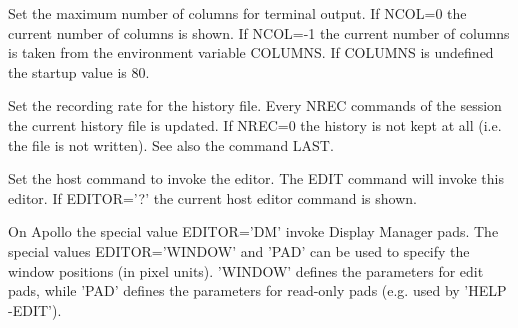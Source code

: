 \ENDCMD


\BEGARG
{}
\ENDARG

   \par
Set the maximum number of columns for terminal output.  If NCOL=0 the 
   current number of columns is shown.  If NCOL=-1 the current number of 
   columns is taken from the environment variable COLUMNS.  If COLUMNS is 
   undefined the startup value is 80.  

\ENDCMD


\BEGARG
{}
\ENDARG

   \par
Set the recording rate for the history file.  Every NREC commands of the 
   session the current history file is updated.  If NREC=0 the history is not 
   kept at all (i.e. the file is not written).  See also the command LAST.  

\ENDCMD


\BEGARG
{}
\ENDARG

   \par
Set the host command to invoke the editor.  The EDIT command will invoke 
   this editor.  If EDITOR='?' the current host editor command is shown.  

   \par
On Apollo the special value EDITOR='DM' invoke Display Manager pads.  The 
   special values EDITOR='WINDOW' and 'PAD' can be used to specify the window 
   positions (in pixel units).  'WINDOW' defines the parameters for edit pads, 
   while 'PAD' defines the parameters for read-only pads (e.g. used by 'HELP 
   -EDIT').  

